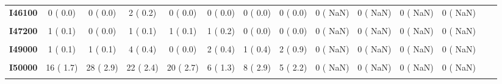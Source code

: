 \documentclass[
]{article}
\begin{document}
\begin{table}[H]
\begin{tabular}[t]{>{\raggedright\arraybackslash}p{5em}ccccccccccccc}
\textbf{I46100} & 0 (  0.0) & 0 (  0.0) & 2 (  0.2) & 0 (  0.0) & 0 (  0.0) & 0 (  0.0) & 0 (  0.0) & 0 (  NaN) & 0 (  NaN) & 0 (  NaN) & 0 (  NaN) &  & \\
\textbf{\cellcolor{gray!10}{I46900}} & \cellcolor{gray!10}{0 (  0.0)} & \cellcolor{gray!10}{1 (  0.1)} & \cellcolor{gray!10}{1 (  0.1)} & \cellcolor{gray!10}{0 (  0.0)} & \cellcolor{gray!10}{0 (  0.0)} & \cellcolor{gray!10}{0 (  0.0)} & \cellcolor{gray!10}{0 (  0.0)} & \cellcolor{gray!10}{0 (  NaN)} & \cellcolor{gray!10}{0 (  NaN)} & \cellcolor{gray!10}{0 (  NaN)} & \cellcolor{gray!10}{0 (  NaN)} & \cellcolor{gray!10}{} & \cellcolor{gray!10}{}\\
\textbf{I47200} & 1 (  0.1) & 0 (  0.0) & 1 (  0.1) & 1 (  0.1) & 1 (  0.2) & 0 (  0.0) & 0 (  0.0) & 0 (  NaN) & 0 (  NaN) & 0 (  NaN) & 0 (  NaN) &  & \\
\textbf{\cellcolor{gray!10}{I48000}} & \cellcolor{gray!10}{5 (  0.5)} & \cellcolor{gray!10}{8 (  0.8)} & \cellcolor{gray!10}{3 (  0.3)} & \cellcolor{gray!10}{3 (  0.4)} & \cellcolor{gray!10}{4 (  0.9)} & \cellcolor{gray!10}{0 (  0.0)} & \cellcolor{gray!10}{1 (  0.4)} & \cellcolor{gray!10}{0 (  NaN)} & \cellcolor{gray!10}{0 (  NaN)} & \cellcolor{gray!10}{0 (  NaN)} & \cellcolor{gray!10}{0 (  NaN)} & \cellcolor{gray!10}{} & \cellcolor{gray!10}{}\\
\textbf{I49000} & 1 (  0.1) & 1 (  0.1) & 4 (  0.4) & 0 (  0.0) & 2 (  0.4) & 1 (  0.4) & 2 (  0.9) & 0 (  NaN) & 0 (  NaN) & 0 (  NaN) & 0 (  NaN) &  & \\
\textbf{\cellcolor{gray!10}{I49900}} & \cellcolor{gray!10}{3 (  0.3)} & \cellcolor{gray!10}{2 (  0.2)} & \cellcolor{gray!10}{2 (  0.2)} & \cellcolor{gray!10}{0 (  0.0)} & \cellcolor{gray!10}{1 (  0.2)} & \cellcolor{gray!10}{1 (  0.4)} & \cellcolor{gray!10}{0 (  0.0)} & \cellcolor{gray!10}{0 (  NaN)} & \cellcolor{gray!10}{0 (  NaN)} & \cellcolor{gray!10}{0 (  NaN)} & \cellcolor{gray!10}{0 (  NaN)} & \cellcolor{gray!10}{} & \cellcolor{gray!10}{}\\
\textbf{I50000} & 16 (  1.7) & 28 (  2.9) & 22 (  2.4) & 20 (  2.7) & 6 (  1.3) & 8 (  2.9) & 5 (  2.2) & 0 (  NaN) & 0 (  NaN) & 0 (  NaN) & 0 (  NaN) &  & \\
\textbf{\cellcolor{gray!10}{I50100}} & \cellcolor{gray!10}{1 (  0.1)} & \cellcolor{gray!10}{3 (  0.3)} & \cellcolor{gray!10}{8 (  0.9)} & \cellcolor{gray!10}{0 (  0.0)} & \cellcolor{gray!10}{0 (  0.0)} & \cellcolor{gray!10}{1 (  0.4)} & \cellcolor{gray!10}{0 (  0.0)} & \cellcolor{gray!10}{0 (  NaN)} & \cellcolor{gray!10}{0 (  NaN)} & \cellcolor{gray!10}{0 (  NaN)} & \cellcolor{gray!10}{0 (  NaN)} & \cellcolor{gray!10}{} & \cellcolor{gray!10}{}\\

\end{tabular}
\end{table}
\end{document}
